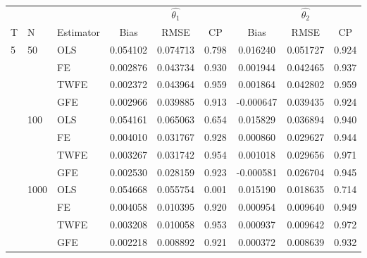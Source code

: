
\begin{tabular}{lll|ccc|ccc}
\toprule
   &      &        &              &  $\hat{\theta_1}$   &                &    & $\hat{\theta_2}$ & \\
T & N & Estimator &      Bias     &      RMSE     &   CP      &      Bias     &      RMSE     &   CP      \\
\midrule
5  & 50   & OLS  &  0.054102 &  0.074713 &                 0.798 &  0.016240 &  0.051727 &                 0.924 \\
   &      & FE  &  0.002876 &  0.043734 &                 0.930 &  0.001944 &  0.042465 &                 0.937 \\
   &      & TWFE  &  0.002372 &  0.043964 &                 0.959 &  0.001864 &  0.042802 &                 0.959 \\
   &      & GFE  &  0.002966 &  0.039885 &                 0.913 & -0.000647 &  0.039435 &                 0.924 \\
   & 100  & OLS  &  0.054161 &  0.065063 &                 0.654 &  0.015829 &  0.036894 &                 0.940 \\
   &      & FE  &  0.004010 &  0.031767 &                 0.928 &  0.000860 &  0.029627 &                 0.944 \\
   &      & TWFE  &  0.003267 &  0.031742 &                 0.954 &  0.001018 &  0.029656 &                 0.971 \\
   &      & GFE  &  0.002530 &  0.028159 &                 0.923 & -0.000581 &  0.026704 &                 0.945 \\
   & 1000 & OLS  &  0.054668 &  0.055754 &                 0.001 &  0.015190 &  0.018635 &                 0.714 \\
   &      & FE  &  0.004058 &  0.010395 &                 0.920 &  0.000954 &  0.009640 &                 0.949 \\
   &      & TWFE  &  0.003208 &  0.010058 &                 0.953 &  0.000937 &  0.009642 &                 0.972 \\
   &      & GFE  &  0.002218 &  0.008892 &                 0.921 &  0.000372 &  0.008639 &                 0.932 \\

\end{tabular}
